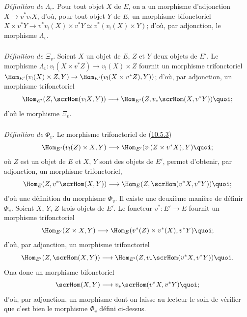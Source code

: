 \subsubsection{}
\emph{Définition de} $\Lambda_v$. Pour tout objet $X$ de $E$, on a
un morphisme d'adjonction $X\rightarrow v^{\ast}v_{!}X$, d'où, pour
tout objet $Y$ de $E$, un morphisme bifonctoriel $X\times
v^{\ast}Y\rightarrow v^{\ast}v_{!}(X)\times v^{\ast}Y\simeq
v^{\ast}(v_{!}(X)\times Y)$; d'où, par adjonction, le morphisme
$\Lambda_v$.

\subsubsection{}
\emph{Définition de} $\Xi_v$. Soient $X$ un objet de $E$, $Z$ et $Y$
deux objets de $E'$. Le morphisme $\Lambda_v:v_{!}(X\times
v^{\ast}Z)\rightarrow v_{!}(X)\times Z$ fournit un morphisme
trifonctoriel $\Hom_{E'}(v_{!}(X)\times Z,Y)\rightarrow
\Hom_{E'}(v_{!}(X\times v^{\ast}Z),Y))$; d'où, par adjonction, un
morphisme trifonctoriel
$$
\Hom_{E'}(Z,\scrHom(v_{!}X,Y))\longrightarrow
\Hom_{E'}(Z,v_{\ast}\scrHom(X,v^{\ast}Y)){\quoi};
$$
d'où le morphisme $\Xi_v$.

\subsubsection{}
\emph{Définition de} $\Phi_v$. Le morphisme trifonctoriel de
(\hyperref[IV.subsubsec10.5.3]{10.5.3})
$$
\Hom_{E'}(v_{!}(Z)\times X,Y)\longrightarrow \Hom_{E'}(v_{!}(Z\times
v^{\ast}X),Y){\quoi};
$$
où $Z$ est un objet de $E$ et $X$, $Y$ sont des objets de $E'$,
permet d'obtenir, par adjonction, un morphisme trifonctoriel,
$$
\Hom_E(Z,v^{\ast}\scrHom(X,Y))\longrightarrow
\Hom_E(Z,\scrHom(v^{\ast}X, v^{\ast}Y)){\quoi};
$$
d'où une définition du morphisme $\Phi_v$. Il existe une deuxième
manière de définir $\Phi_v$. Soient $X$, $Y$, $Z$ trois objets de
$E'$. Le foncteur $v^{\ast}:E'\rightarrow E$ fournit un morphisme
trifonctoriel
$$
\Hom_{E'}(Z\times X,Y)\longrightarrow \Hom_E (v^{\ast}(Z)\times
v^{\ast}(X), v^{\ast}Y){\quoi};
$$
d'où, par adjonction, un morphisme trifonctoriel
$$
\Hom_{E'}(Z,\scrHom(X,Y))\longrightarrow
\Hom_{E'}(Z,v_{\ast}\scrHom(v^{\ast}X, v^{\ast}Y)){\quoi}.
$$
On\pageoriginale a donc un morphisme bifonctoriel
$$
\scrHom(X,Y)\longrightarrow v_{\ast}\scrHom(v^{\ast}X,
v^{\ast}Y){\quoi};
$$
d'où, par adjonction, un morphisme dont on laisse au lecteur le soin
de vérifier que c'est bien le morphisme $\Phi_v$ défini ci-dessus.

